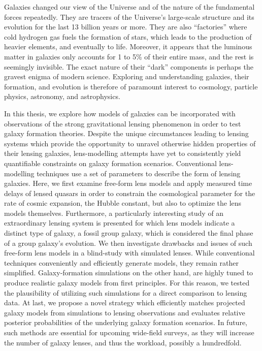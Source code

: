 
Galaxies changed our view of the Universe and of the nature of the fundamental
forces repeatedly.  They are tracers of the Universe's large-scale structure and
its evolution for the last 13 billion years or more.  They are also
``factories'' where cold hydrogen gas fuels the formation of stars, which leads
to the production of heavier elements, and eventually to life.  Moreover, it
appears that the luminous matter in galaxies only accounts for 1 to 5\% of their
entire mass, and the rest is seemingly invisible.  The exact nature of their
``dark'' components is perhaps the gravest enigma of modern science.  Exploring
and understanding galaxies, their formation, and evolution is therefore of
paramount interest to cosmology, particle physics, astronomy, and astrophysics.

In this thesis, we explore how models of galaxies can be incorporated with
observations of the strong gravitational lensing phenomenon in order to test
galaxy formation theories.  Despite the unique circumstances leading to lensing
systems which provide the opportunity to unravel otherwise hidden properties of
their lensing galaxies, lens-modelling attempts have yet to consistently yield
quantifiable constraints on galaxy formation scenarios.  Conventional
lens-modelling techniques use a set of parameters to describe the form of
lensing galaxies.  Here, we first examine free-form lens models and apply
measured time delays of lensed quasars in order to constrain the cosmological
parameter for the rate of cosmic expansion, the Hubble constant, but also to
optimize the lens models themselves.  Furthermore, a particularly interesting
study of an extraordinary lensing system is presented for which lens models
indicate a distinct type of galaxy, a fossil group galaxy, which is considered
the final phase of a group galaxy's evolution.  We then investigate drawbacks
and issues of such free-form lens models in a blind-study with simulated lenses.
While conventional techniques conveniently and efficiently generate models, they
remain rather simplified.  Galaxy-formation simulations on the other hand, are
highly tuned to produce realistic galaxy models from first principles.  For this
reason, we tested the plausibility of utilizing such simulations for a direct
comparison to lensing data.  At last, we propose a novel strategy which
efficiently matches projected galaxy models from simulations to lensing
observations and evaluates relative posterior probabilities of the underlying
galaxy formation scenarios.  In future, such methods are essential for upcoming
wide-field surveys, as they will increase the number of galaxy lenses, and thus
the workload, possibly a hundredfold.
